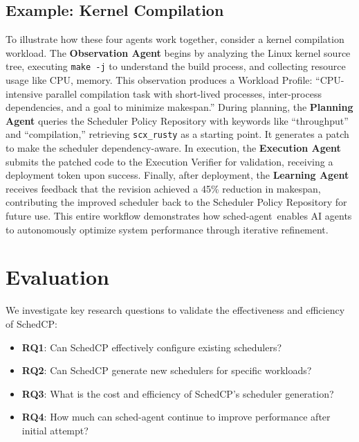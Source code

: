 \documentclass[preprint]{article}
\newcommand{\sys}{SchedCP\xspace}
\newcommand{\agent}{sched-agent\xspace}
\begin{document}
\subsection{Example: Kernel Compilation}

To illustrate how these four agents work together, consider a kernel compilation workload. The \textbf{Observation Agent} begins by analyzing the Linux kernel source tree, executing \texttt{make -j} to understand the build process, and collecting resource usage like CPU, memory. This observation produces a Workload Profile: ``CPU-intensive parallel compilation task with short-lived processes, inter-process dependencies, and a goal to minimize makespan.'' During planning, the \textbf{Planning Agent} queries the Scheduler Policy Repository with keywords like ``throughput'' and ``compilation,'' retrieving \texttt{scx\_rusty} as a starting point. It generates a patch to make the scheduler dependency-aware. In execution, the \textbf{Execution Agent} submits the patched code to the Execution Verifier for validation, receiving a deployment token upon success. Finally, after deployment, the \textbf{Learning Agent} receives feedback that the revision achieved a 45\% reduction in makespan, contributing the improved scheduler back to the Scheduler Policy Repository for future use. This entire workflow demonstrates how \agent\ enables AI agents to autonomously optimize system performance through iterative refinement.

\section{Evaluation}
\label{sec:evaluation}


We investigate key research questions to validate the effectiveness and efficiency of \sys:

\begin{itemize}
\item \textbf{RQ1}: Can \sys effectively configure existing schedulers?
\item \textbf{RQ2}: Can \sys generate new schedulers for specific workloads?
\item \textbf{RQ3}: What is the cost and efficiency of \sys's scheduler generation?
\item \textbf{RQ4}: How much can \agent continue to improve performance after initial attempt?
\end{itemize}
\end{document}
